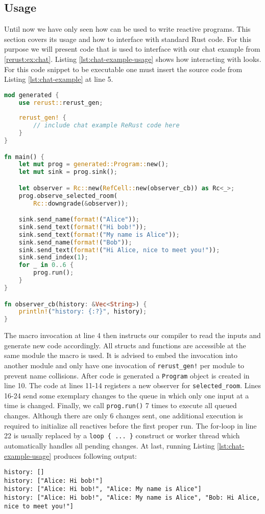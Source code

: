 \subsection{Usage}
Until now we have only seen how \rerust can be used to write reactive programs. This section covers its usage and how to interface with standard Rust code. For this purpose we will present code that is used to interface with our chat example from \ref{rerust:ex:chat}. Listing \ref{lst:chat-example-usage} shows how interacting with \rerust looks. For this code snippet to be executable one must insert the source code from Listing \ref{lst:chat-example} at line 5.

\begin{lstlisting}[language=Rust,style=colouredRust,caption=Chat example usage,label=lst:chat-example-usage]
mod generated {
    use rerust::rerust_gen;
    
    rerust_gen! {
        // include chat example ReRust code here
    }
}

fn main() {
    let mut prog = generated::Program::new();
    let mut sink = prog.sink();

    let observer = Rc::new(RefCell::new(observer_cb)) as Rc<_>;
    prog.observe_selected_room(
        Rc::downgrade(&observer));

    sink.send_name(format!("Alice"));
    sink.send_text(format!("Hi bob!"));
    sink.send_text(format!("My name is Alice"));
    sink.send_name(format!("Bob"));
    sink.send_text(format!("Hi Alice, nice to meet you!"));
    sink.send_index(1);
    for _ in 0..6 {
        prog.run();
    }
}

fn observer_cb(history: &Vec<String>) {
    println!("history: {:?}", history);
}
\end{lstlisting}

The macro invocation at line 4 then instructs our \rerust compiler to read the inputs and generate new code accordingly. All structs and functions are accessible at the same module the macro is used. It is advised to embed the invocation into another module and only have one invocation of \lstinline{rerust_gen!} per module to prevent name collisions. After code is generated a \lstinline{Program} object is created in line 10. The code at lines 11-14 registers a new observer for \lstinline{selected_room}. Lines 16-24 send some exemplary changes to the queue in which only one input at a time is changed. Finally, we call \lstinline{prog.run()} 7 times to execute all queued changes. Although there are only 6 changes sent, one additional execution is required to initialize all reactives before the first proper run. The for-loop in line 22 is usually replaced by a \lstinline|loop { ... }| construct or worker thread which automatically handles all pending changes. At last, running Listing \ref{lst:chat-example-usage} produces following output:
\begin{lstlisting}[numbers=none]
history: []
history: ["Alice: Hi bob!"]
history: ["Alice: Hi bob!", "Alice: My name is Alice"]
history: ["Alice: Hi bob!", "Alice: My name is Alice", "Bob: Hi Alice, nice to meet you!"]
\end{lstlisting}

